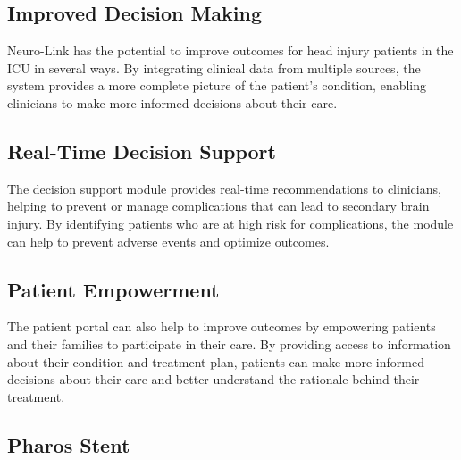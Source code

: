 \documentclass{article}
\begin{document}
\subsection{Improved Decision Making}

Neuro-Link has the potential to improve outcomes for head injury patients in the ICU in several ways. By integrating clinical data from multiple sources, the system provides a more complete picture of the patient's condition, enabling clinicians to make more informed decisions about their care.

\subsection{Real-Time Decision Support}

The decision support module provides real-time recommendations to clinicians, helping to prevent or manage complications that can lead to secondary brain injury. By identifying patients who are at high risk for complications, the module can help to prevent adverse events and optimize outcomes.

\subsection{Patient Empowerment}

The patient portal can also help to improve outcomes by empowering patients and their families to participate in their care. By providing access to information about their condition and treatment plan, patients can make more informed decisions about their care and better understand the rationale behind their treatment.




\subsection{Pharos Stent}
\end{document}
